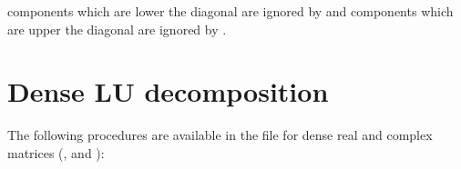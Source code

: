 \documentclass[a4paper,11pt,english]{sphinxmanual}
\begin{document}
\sphinxAtStartPar
components which are lower the diagonal are ignored by  and components which are upper the diagonal are ignored by .


\chapter{Dense LU decomposition}
\label{\detokenize{gmm/denselu:dense-lu-decomposition}}\label{\detokenize{gmm/denselu:gmm-denselu}}\label{\detokenize{gmm/denselu::doc}}
\sphinxAtStartPar
The following procedures are available in the file  for dense real and complex matrices (,  and ):
\end{document}

